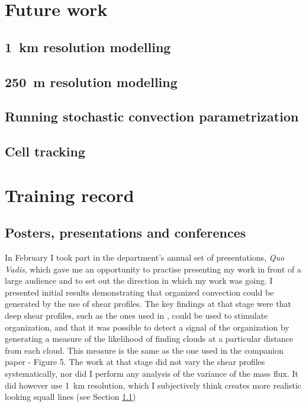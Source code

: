 \documentclass[11pt,a4paper]{article}
\begin{document}

\section{Future work}

\subsection{\SI{1}{km} resolution modelling}
\label{sec:1km_res}

\subsection{\SI{250}{m} resolution modelling}

\subsection{Running stochastic convection parametrization}

\subsection{Cell tracking}

\section{Training record}
\label{sec:Training record}

\subsection{Posters, presentations and conferences}

In February I took part in the department's annual set of presentations, \textit{Quo Vadis}, which gave me an opportunity to practise presenting my work in front of a large audience and to set out the direction in which my work was going. I presented initial results demonstrating that organized convection could be generated by the use of shear profiles. The key findings at that stage were that deep shear profiles, such as the ones used in \cite{cohen2006fluctuations}, could be used to stimulate organization, and that it was possible to detect a signal of the organization by generating a measure of the likelihood of finding clouds at a particular distance from each cloud. This measure is the same as the one used in the companion paper \cite{muetz2017effects} - Figure 5. The work at that stage did not vary the shear profiles systematically, nor did I perform any analysis of the variance of the mass flux. It did however use \SI{1}{km} resolution, which I subjectively think creates more realistic looking squall lines (see Section \ref{sec:1km_res})
\end{document}
